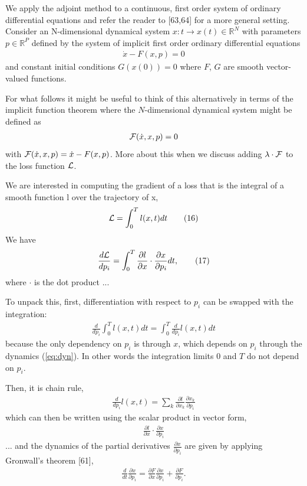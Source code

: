 \documentclass[a4paper]{article}
\newcommand{\blue}[1]{{\color{blue}#1}}
\newcommand{\R}{{\mathbb R}}
\begin{document}
\blue{ We apply the adjoint method to a continuous, first order system of ordinary differential
equations and refer the reader to [63,64] for a more general setting. Consider an N-dimensional dynamical system
$x : t  \rightarrow x(t) \in \R^N$ with parameters $p \in \R^P$
defined by the system of implicit first order ordinary differential 
equations
\begin{align}
\dot{x} - F(x,p) = 0 \tag{15} \label{eq:dyn}
\end{align}
and constant initial conditions $G(x(0)) = 0$ where $F$, $G$ are smooth vector-valued functions.
}

For what follows it might be useful to think of this alternatively in
terms of the implicit function theorem where the $N$-dimensional
dynamical system might be defined as
\begin{align}
  {\cal F}(\dot{x}, x, p) = 0  \label{eq:dyn2}
\end{align}
with ${\cal F}(\dot{x}, x, p) = \dot{x} - F(x,p)$. More about this
when we discuss adding $\lambda \cdot {\cal F}$ to the loss function
$\cal L$.

\blue{We are interested in computing the gradient of a loss that is
  the integral of a smooth function l over the trajectory of x,
  \begin{align}
    {\cal L} =\int_0^T l(x,t) dt \tag{16}
  \end{align}
  We have
  \begin{align}
    \frac{d{\cal L}}{dp_i} = \int_0^T \frac{\partial l}{\partial x}
    \cdot \frac{\partial x}{\partial p_i} dt, \tag{17}
  \end{align}
  where $\cdot$ is the dot product ...
}

To unpack this, first, differentiation with respect to $p_i$ can be
swapped with the integration:
\begin{align}
  \frac{d}{dp_i} \int_0^T l(x,t) dt = \int_0^T \frac{d}{dp_i} l(x,t) dt
\end{align}
because the only dependency on $p_i$ is through $x$, which depends on
$p_i$ through the dynamics \blue{(\ref{eq:dyn})}. In other words the
integration limits $0$ and $T$ do not depend on $p_i$.

Then, it is chain rule,
\begin{align}
  \frac{d}{dp_i} l(x,t) = \sum_k \frac{\partial l}{\partial x_k}
   \frac{\partial x_k}{\partial p_i}
\end{align}
which can then be written using the scalar product in vector form,
\begin{align}
  \frac{\partial l}{\partial x}
  \cdot \frac{\partial x}{\partial p_i}
\end{align}
\blue{... and the dynamics of the partial derivatives $\frac{\partial
    x}{\partial p_i}$ are given by applying Gronwall’s theorem [61],
  \begin{align}
    \frac{d}{dt} \frac{\partial x}{\partial p_i} = \frac{\partial
      F}{\partial x}\frac{\partial x}{\partial p_i} + \frac{\partial
      F}{\partial p_i} . \tag{18}
  \end{align}
}
\end{document}
